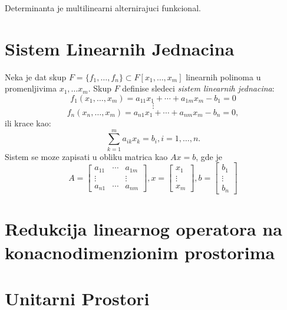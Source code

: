 \documentclass[12p,a4paper]{article}
\begin{document}
\begin{multicols}{2}
    Determinanta je multilinearni alternirajuci funkcional.


\section{Sistem Linearnih Jednacina}

    Neka je dat skup $F = \{f_1, \ldots, f_n\} \subset F[ x_1, \ldots, x_m ]$
    linearnih polinoma u promenljivima $x_1, \ldots x_m$. Skup $F$ definise 
    sledeci \textit{sistem linearnih jednacina}:
    \[f_1(x_1, \ldots, x_m) = a_{11}x_1 + \cdots + a_{1m}x_m - b_1 = 0\]
    \[\vdots\]
    \[f_n(x_n, \ldots, x_m) = a_{n1}x_1 + \cdots + a_{nm}x_m - b_n = 0,\]
    ili krace kao:
    \[\sum_{k=1}^m a_{ik}x_k= b_i, i=1,\ldots,n.\]
    Sistem se moze zapisati u obliku matrica kao $Ax = b$, gde je
    \[
        A = 
        \begin{bmatrix}
            a_{11} & \cdots & a_{1m} \\
            \vdots & &        \vdots \\
            a_{n1} & \cdots & a_{nm} 
        \end{bmatrix},
        x = 
        \begin{bmatrix}
            x_1     \\
            \vdots  \\
            x_m
        \end{bmatrix},
        b = 
        \begin{bmatrix}
            b_1     \\
            \vdots  \\
            b_n
        \end{bmatrix}
    \]

\section{Redukcija linearnog operatora na konacnodimenzionim prostorima}

\section{Unitarni Prostori}


\end{multicols}
\end{document}
